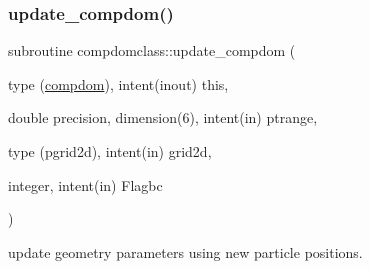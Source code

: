\mbox{\label{namespacecompdomclass_a0e7d562b378f77e0d3a14b33168cb46b}} 
\subsubsection{\texorpdfstring{update\_compdom()}{update\_compdom()}}
{\footnotesize\ttfamily subroutine compdomclass\+::update\+\_\+compdom (\begin{DoxyParamCaption}\item[{type (\mbox{\hyperlink{namespacecompdomclass_structcompdomclass_1_1compdom}{compdom}}), intent(inout)}]{this,  }\item[{double precision, dimension(6), intent(in)}]{ptrange,  }\item[{type (pgrid2d), intent(in)}]{grid2d,  }\item[{integer, intent(in)}]{Flagbc }\end{DoxyParamCaption})}



update geometry parameters using new particle positions. 

